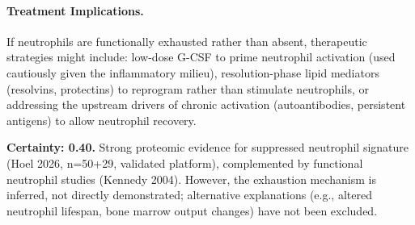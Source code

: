 \begin{hypothesis}
\paragraph{Treatment Implications.}
If neutrophils are functionally exhausted rather than absent, therapeutic strategies might include: low-dose G-CSF to prime neutrophil activation (used cautiously given the inflammatory milieu), resolution-phase lipid mediators (resolvins, protectins) to reprogram rather than stimulate neutrophils, or addressing the upstream drivers of chronic activation (autoantibodies, persistent antigens) to allow neutrophil recovery.

\textbf{Certainty: 0.40.} Strong proteomic evidence for suppressed neutrophil signature (Hoel 2026, n=50+29, validated platform), complemented by functional neutrophil studies (Kennedy 2004). However, the exhaustion mechanism is inferred, not directly demonstrated; alternative explanations (e.g., altered neutrophil lifespan, bone marrow output changes) have not been excluded.
\end{hypothesis}

